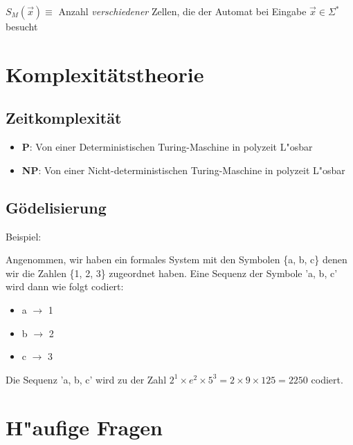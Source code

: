\documentclass[11pt, a4paper]{scrartcl}
\begin{document}
$S_M(\vec{x}) \equiv$ Anzahl \textit{verschiedener} Zellen, die der Automat bei Eingabe $\vec{x} \in \Sigma^*$ besucht


\section{Komplexitätstheorie}

\subsection{Zeitkomplexität}

\begin{itemize}
    \item \textbf{P}: Von einer Deterministischen Turing-Maschine in polyzeit L"osbar
    \item \textbf{NP}: Von einer Nicht-deterministischen Turing-Maschine in polyzeit L"osbar
\end{itemize}


\subsection{Gödelisierung}

Beispiel:

Angenommen, wir haben ein formales System mit den Symbolen \{a, b, c\} denen wir die Zahlen \{1, 2, 3\} zugeordnet haben. Eine Sequenz der Symbole 'a, b, c' wird dann wie folgt codiert:

\begin{itemize}
    \item a $\rightarrow$ 1
    \item b $\rightarrow$ 2
    \item c $\rightarrow$ 3
\end{itemize}

Die Sequenz 'a, b, c' wird zu der Zahl $2^1 \times e^2 \times 5^3 = 2 \times 9 \times 125 = 2250$ codiert.

\newpage

\section{H"aufige Fragen}
\end{document}
